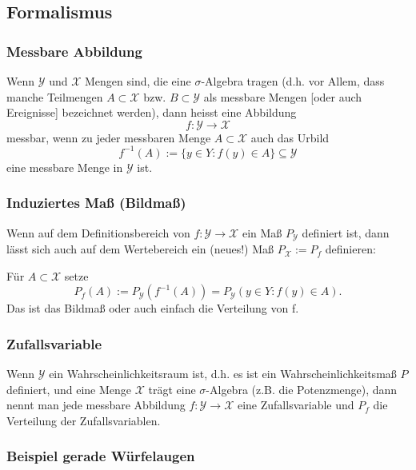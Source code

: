 \subsection{Formalismus}

\begin{frame}
  \frametitle{Messbare Abbildung}
  Wenn $\mathcal{Y}$ und $\mathcal{X}$ Mengen sind, die eine $\sigma$-Algebra tragen (d.h. vor Allem, dass manche Teilmengen $A \subset \mathcal{X}$ bzw. $B \subset \mathcal{Y}$ als messbare Mengen [oder auch Ereignisse] bezeichnet werden), dann heisst eine Abbildung
  \[f \colon \mathcal{Y} \to \mathcal{X}\]
  \alert{messbar}, wenn zu jeder messbaren Menge $A \subset \mathcal{X}$ auch das Urbild
  \[f^{-1}(A) := \{ y \in Y : f(y) \in A \} \subseteq \mathcal{Y}\]
  eine messbare Menge in $\mathcal{Y}$ ist.
\end{frame}

\begin{frame}
  \frametitle{Induziertes Maß (Bildmaß)}
  Wenn auf dem Definitionsbereich von $f \colon \mathcal{Y} \to \mathcal{X}$ ein Maß $P_{\mathcal{Y}}$ definiert ist,
  dann lässt sich auch auf dem Wertebereich ein (neues!) Maß $P_{\mathcal{X}} := P_f$ definieren:
    
    Für $A \subset \mathcal{X}$ setze
    \[P_f(A) := P_{\mathcal{Y}}\left( f^{-1}(A) \right) = P_{\mathcal{Y}}\left( y \in Y : f(y) \in A \right). \]
    Das ist das \alert{Bildmaß} oder auch einfach \alert{die Verteilung von f}.
\end{frame}

\begin{frame}
  \frametitle{Zufallsvariable}
  Wenn $\mathcal{Y}$ ein Wahrscheinlichkeitsraum ist, d.h. es ist ein Wahrscheinlichkeitsmaß $P$ definiert,
  und eine Menge $\mathcal{X}$ trägt eine $\sigma$-Algebra (z.B. die Potenzmenge),
  dann nennt man jede messbare Abbildung $f \colon \mathcal{Y} \to \mathcal{X}$ eine \alert{Zufallsvariable} und $P_f$ die \alert{Verteilung der Zufallsvariablen}.
\end{frame}

\begin{frame}
  \frametitle{Beispiel gerade Würfelaugen}
  
\end{frame}

